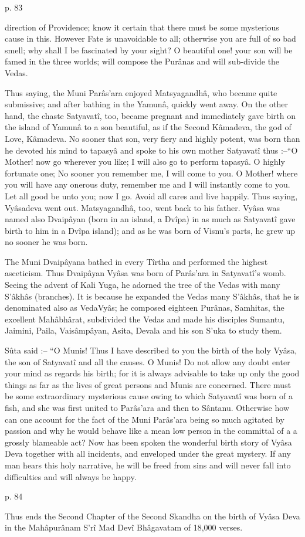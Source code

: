  

p. 83

 

direction of Providence; know it certain that there must be some mysterious cause in this. However Fate is unavoidable to all; otherwise you are full of so bad smell; why shall I be fascinated by your sight? O beautiful one! your son will be famed in the three worlds; will compose the Purânas and will sub-divide the Vedas.

 

Thus saying, the Muni Parâs'ara enjoyed Matsyagandhâ, who became quite submissive; and after bathing in the Yamunâ, quickly went away. On the other hand, the chaste Satyavatî, too, became pregnant and immediately gave birth on the island of Yamunâ to a son beautiful, as if the Second Kâmadeva, the god of Love, Kâmadeva. No sooner that son, very fiery and highly potent, was born than he devoted his mind to tapasyâ and spoke to his own mother Satyavatî thus :--“O Mother! now go wherever you like; I will also go to perform tapasyâ. O highly fortunate one; No sooner you remember me, I will come to you. O Mother! where you will have any onerous duty, remember me and I will instantly come to you. Let all good be unto you; now I go. Avoid all cares and live happily. Thus saying, Vyâsadeva went out. Matsyagandhâ, too, went back to his father. Vyâsa was named also Dvaipâyan (born in an island, a Dvîpa) in as much as Satyavatî gave birth to him in a Dvîpa island); and as he was born of Visnu's parts, he grew up no sooner he was born.

 

The Muni Dvaipâyana bathed in every Tîrtha and performed the highest asceticism. Thus Dvaipâyan Vyâsa was born of Parâs'ara in Satyavatî’s womb. Seeing the advent of Kali Yuga, he adorned the tree of the Vedas with many S’âkhâs (branches). It is because he expanded the Vedas many S’âkhâs, that he is denominated also as VedaVyâs; he composed eighteen Purânas, Samhitas, the excellent Mahâbhârat, subdivided the Vedas and made his disciples Sumantu, Jaimini, Paila, Vaisâmpâyan, Asita, Devala and his son S’uka to study them.

 

Sûta said :-- “O Munis! Thus I have described to you the birth of the holy Vyâsa, the son of Satyavatî and all the causes. O Munis! Do not allow any doubt enter your mind as regards his birth; for it is always advisable to take up only the good things as far as the lives of great persons and Munis are concerned. There must be some extraordinary mysterious cause owing to which Satyavatî was born of a fish, and she was first united to Parâs'ara and then to Sântanu. Otherwise how can one account for the fact of the Muni Parâs’ara being so much agitated by passion and why he would behave like a mean low person in the committal of a a grossly blameable act? Now has been spoken the wonderful birth story of Vyâsa Deva together with all incidents, and enveloped under the great mystery. If any man hears this holy narrative, he will be freed from sins and will never fall into difficulties and will always be happy.

 

p. 84

 

Thus ends the Second Chapter of the Second Skandha on the birth of Vyâsa Deva in the Mahâpurânam S’rî Mad Devî Bhâgavatam of 18,000 verses.